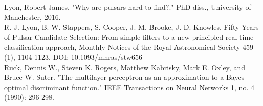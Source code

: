 \documentclass[]{article}
\begin{document}
Lyon, Robert James. "Why are pulsars hard to find?." PhD diss., University of Manchester, 2016.
\\

R. J. Lyon, B. W. Stappers, S. Cooper, J. M. Brooke, J. D. Knowles, Fifty Years of Pulsar Candidate Selection: From simple filters to a new principled real-time classification approach, Monthly Notices of the Royal Astronomical Society 459 (1), 1104-1123, DOI: 10.1093/mnras/stw656
\\

Ruck, Dennis W., Steven K. Rogers, Matthew Kabrisky, Mark E. Oxley, and Bruce W. Suter. "The multilayer perceptron as an approximation to a Bayes optimal discriminant function." IEEE Transactions on Neural Networks 1, no. 4 (1990): 296-298.
\\


\newpage
\end{document}
